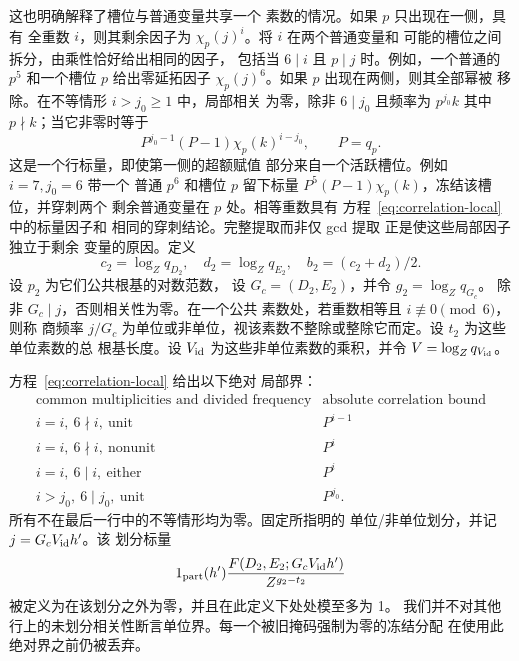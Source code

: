\documentclass[11pt,a4paper]{article}
\numberwithin{equation}{section}
\numberwithin{figure}{section}
\theoremstyle{definition}
\theoremstyle{remark}
\begin{document}
这也明确解释了槽位与普通变量共享一个
素数的情况。如果 \(p\) 只出现在一侧，具有
全重数 \(i\)，则其剩余因子为
\(\chi_p(j)^i\)。将 \(i\) 在两个普通变量和
可能的槽位之间拆分，由乘性恰好给出相同的因子，
包括当 \(6\mid i\) 且 \(p\mid j\) 时。例如，一个普通的
\(p^5\) 和一个槽位 \(p\) 给出零延拓因子
\(\chi_p(j)^6\)。如果 \(p\) 出现在两侧，则其全部幂被
移除。在不等情形 \(i>j_0\ge1\) 中，局部相关
为零，除非 \(6\mid j_0\) 且频率为 \(p^{j_0}k\)
其中 \(p\nmid k\)；当它非零时等于
\[
 P^{j_0-1}(P-1)\chi_p(k)^{i-j_0},\qquad P=q_p.
\]
这是一个行标量，即使第一侧的超额赋值
部分来自一个活跃槽位。例如 \(i=7,j_0=6\) 带一个
普通 \(p^6\) 和槽位 \(p\) 留下标量
\(P^5(P-1)\chi_p(k)\)，冻结该槽位，并穿刺两个
剩余普通变量在 \(p\) 处。相等重数具有
方程~\eqref{eq:correlation-local} 中的标量因子和
相同的穿刺结论。完整提取而非仅 gcd 提取
正是使这些局部因子独立于剩余
变量的原因。定义
\[
 c_2=\log_Zq_{D_2},\quad d_2=\log_Zq_{E_2},\quad
 b_2=(c_2+d_2)/2.
\]
设 \(p_2\) 为它们公共根基的对数范数，
设 \(G_c=(D_2,E_2)\)，并令 \(g_2=\log_Zq_{G_c}\)。
除非 \(G_c\mid j\)，否则相关性为零。在一个公共
素数处，若重数相等且 \(i\not\equiv0\pmod6\)，则称
商频率 \(j/G_c\) 为单位或非单位，视该素数不整除或整除它而定。设 \(t_2\) 为这些单位素数的总
根基长度。设 \(V_{\rm id}\) 为这些非单位素数的乘积，并令
\(V=\log_Zq_{V_{\rm id}}\)。

方程~\eqref{eq:correlation-local} 给出以下绝对
局部界：
\[
 \begin{array}{c|c}
 \text{common multiplicities and divided frequency}&
       \text{absolute correlation bound}\\ \hline
 i=i,\ 6\nmid i,\ \text{unit}&P^{i-1}\\
 i=i,\ 6\nmid i,\ \text{nonunit}&P^i\\
 i=i,\ 6\mid i,\ \text{either}&P^i\\
 i>j_0,\ 6\mid j_0,\ \text{unit}&P^{j_0}.
 \end{array}
\]
所有不在最后一行中的不等情形均为零。固定所指明的
单位/非单位划分，并记 \(j=G_cV_{\rm id}h'\)。该
划分标量
\[
 1_{\rm part}(h')
 \frac{F(D_2,E_2;G_cV_{\rm id}h')}{Z^{g_2-t_2}}
\]
被定义为在该划分之外为零，并且在此定义下处处模至多为 1。
我们并不对其他行上的未划分相关性断言单位界。每一个被旧掩码强制为零的冻结分配
在使用此绝对界之前仍被丢弃。
\end{document}
